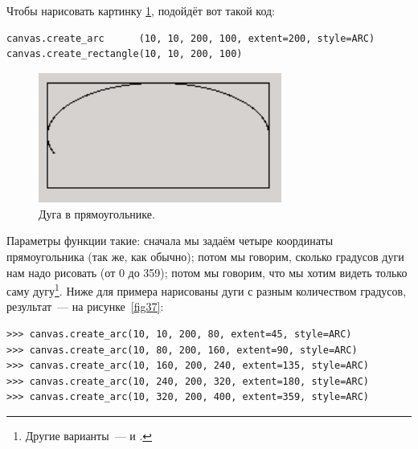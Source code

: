Чтобы нарисовать картинку \ref{fig36}, подойдёт вот такой код:

\begin{listing}
\begin{verbatim}
canvas.create_arc      (10, 10, 200, 100, extent=200, style=ARC)
canvas.create_rectangle(10, 10, 200, 100)
\end{verbatim}
\end{listing}

\begin{figure}
\begin{center}
\includegraphics[width=80mm]{figure36.png}
\end{center}
\caption{Дуга в прямоугольнике.}\label{fig36}
\end{figure}

Параметры функции  такие: сначала мы задаём четыре координаты прямоугольника (так же, как обычно); потом мы говорим, сколько градусов дуги нам надо рисовать (от 0 до 359); потом мы говорим, что мы хотим видеть только саму дугу\footnote{Другие варианты —  и .}. Ниже для примера нарисованы дуги с разным количеством градусов, результат — на рисунке \ref{fig37}:

\begin{listing}
\begin{verbatim}
>>> canvas.create_arc(10, 10, 200, 80, extent=45, style=ARC)
>>> canvas.create_arc(10, 80, 200, 160, extent=90, style=ARC)
>>> canvas.create_arc(10, 160, 200, 240, extent=135, style=ARC)
>>> canvas.create_arc(10, 240, 200, 320, extent=180, style=ARC)
>>> canvas.create_arc(10, 320, 200, 400, extent=359, style=ARC)
\end{verbatim}
\end{listing}

